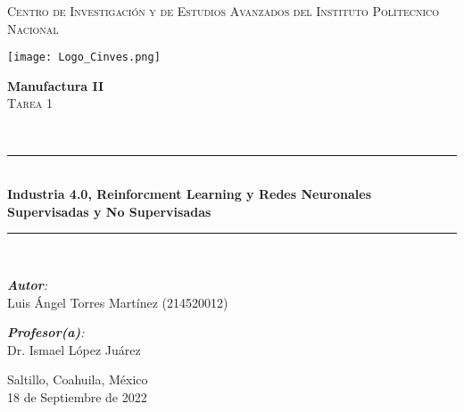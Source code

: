 \begin{center}
    \newcommand{\HRule}{\rule{\linewidth}{0.5mm}}
    \vspace*{0.5cm}

    \begin{spacing}{1.5}
        \textsc{\huge Centro de Investigación y de Estudios Avanzados del Instituto Politecnico Nacional}\\[0.15cm]
    \end{spacing}

    \begin{center}
        \texttt{[image: Logo\_Cinves.png]}
    \end{center}

    \begin{minipage}{0.9\textwidth}
        \begin{center}
            \textbf{\Large Manufactura II}\\
            \vspace*{0.5cm}
            \textsc{\LARGE Tarea 1 }
        \end{center}
    \end{minipage}\\[0.1cm]

 	\vspace*{1cm}

    \HRule \\[0.4cm]{\huge \bfseries Industria 4.0, Reinforcment Learning y Redes Neuronales
    Supervisadas y No Supervisadas}\\[0.4cm] %
    \HRule \\[1.5cm]

    \begin{minipage}{\textwidth}
        \begin{flushleft} \large
            \emph{\textbf{Autor}:}\\
            Luis Ángel Torres Martínez  (214520012)
        \end{flushleft}
    \end{minipage}

    \begin{minipage}{\textwidth}
        \vspace{-1cm}
        \begin{flushright} \large
            \emph{\textbf{Profesor(a)}:} \\
            Dr. Ismael López Juárez \\
        \end{flushright}
    \end{minipage}

    \vspace{3cm}
    
    Saltillo, Coahuila, México \\ %
    18 de Septiembre de 2022\\ %
\end{center}